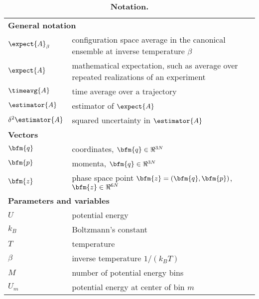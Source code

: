 
\begin{table*}[p]
\caption{{\bf Notation.}}
\begin{tabular}{ll}
\hline
\multicolumn{2}{l}{\bf General notation} \\
$\expect{A}_\beta$ & configuration space average in the canonical ensemble at inverse temperature $\beta$ \\
$\expect{A}$ & mathematical expectation, such as average over repeated realizations of an experiment \\
$\timeavg{A}$ & time average over a trajectory \\
$\estimator{A}$ & estimator of $\expect{A}$ \\
$\delta^2 \estimator{A}$ & squared uncertainty in $\estimator{A}$ \\
\multicolumn{2}{l}{\bf Vectors} \\
$\bfm{q}$ & coordinates, $\bfm{q} \in \Re^{3N}$ \\
$\bfm{p}$ & momenta, $\bfm{q} \in \Re^{3N}$ \\
$\bfm{z}$ & phase space point $\bfm{z} = (\bfm{q}, \bfm{p})$, $\bfm{z} \in \Re^{6N}$ \\
\multicolumn{2}{l}{\bf Parameters and variables} \\
$U$ & potential energy \\
$k_B$ & Boltzmann's constant \\
$T$ & temperature \\
$\beta$ & inverse temperature $1/(k_B T)$ \\
$M$ & number of potential energy bins \\
$U_m$ & potential energy at center of bin $m$ \\

\end{tabular}
\end{table*}
